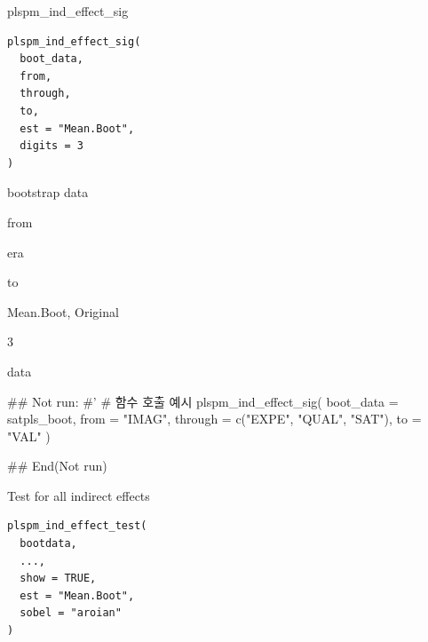 \documentclass[a4paper]{book}
\begin{document}
%
\begin{Description}
plspm\_ind\_effect\_sig
\end{Description}
%
\begin{Usage}
\begin{verbatim}
plspm_ind_effect_sig(
  boot_data,
  from,
  through,
  to,
  est = "Mean.Boot",
  digits = 3
)
\end{verbatim}
\end{Usage}
%
\begin{Arguments}
\begin{ldescription}
\item[\code{boot\_data}] bootstrap data

\item[\code{from}] from

\item[\code{through}] era

\item[\code{to}] to

\item[\code{est}] Mean.Boot, Original

\item[\code{digits}] 3
\end{ldescription}
\end{Arguments}
%
\begin{Value}
data
\end{Value}
%
\begin{Examples}
\begin{ExampleCode}

\#\# Not run: 
#'
# 함수 호출 예시
plspm_ind_effect_sig(
  boot_data = satpls_boot,
  from = "IMAG",
  through = c("EXPE", "QUAL", "SAT"),
  to = "VAL"
)


## End(Not run)



\end{ExampleCode}
\end{Examples}
%
\begin{Description}
Test for all indirect effects
\end{Description}
%
\begin{Usage}
\begin{verbatim}
plspm_ind_effect_test(
  bootdata,
  ...,
  show = TRUE,
  est = "Mean.Boot",
  sobel = "aroian"
)
\end{verbatim}
\end{Usage}
\end{document}
